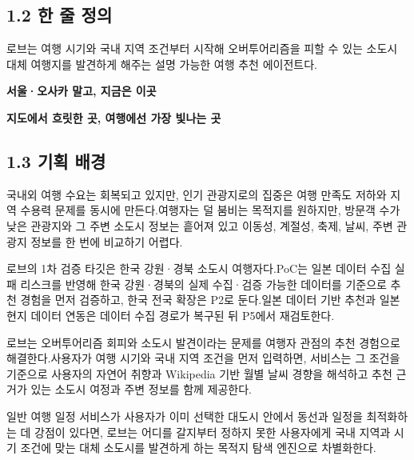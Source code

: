 \documentclass[12pt,a4paper]{article}
\newcommand{\DocNeedspace}[1]{\par\ifdim\dimexpr\pagegoal-\pagetotal\relax<#1\newpage\fi}
\begin{document}
\DocNeedspace{24\baselineskip}
\subsection*{1.2 한 줄 정의}


\DocNeedspace{3\baselineskip}
로브는 여행 시기와 국내 지역 조건부터 시작해 오버투어리즘을 피할 수 있는 소도시 대체 여행지를 발견하게 해주는 설명 가능한 여행 추천 에이전트다.


\DocNeedspace{3\baselineskip}
\textbf{서울·오사카 말고, 지금은 이곳}


\DocNeedspace{3\baselineskip}
\textbf{지도에서 흐릿한 곳, 여행에선 가장 빛나는 곳}


\DocNeedspace{24\baselineskip}
\subsection*{1.3 기획 배경}


\DocNeedspace{3\baselineskip}
국내외 여행 수요는 회복되고 있지만, 인기 관광지로의 집중은 여행 만족도 저하와 지역 수용력 문제를 동시에 만든다.\newline 여행자는 덜 붐비는 목적지를 원하지만, 방문객 수가 낮은 관광지와 그 주변 소도시 정보는 흩어져 있고 이동성, 계절성, 축제, 날씨, 주변 관광지 정보를 한 번에 비교하기 어렵다.


\DocNeedspace{3\baselineskip}
로브의 1차 검증 타깃은 한국 강원·경북 소도시 여행자다.\newline PoC는 일본 데이터 수집 실패 리스크를 반영해 한국 강원·경북의 실제 수집·검증 가능한 데이터를 기준으로 추천 경험을 먼저 검증하고, 한국 전국 확장은 P2로 둔다.\newline 일본 데이터 기반 추천과 일본 현지 데이터 연동은 데이터 수집 경로가 복구된 뒤 P5에서 재검토한다.


\DocNeedspace{3\baselineskip}
로브는 오버투어리즘 회피와 소도시 발견이라는 문제를 여행자 관점의 추천 경험으로 해결한다.\newline 사용자가 여행 시기와 국내 지역 조건을 먼저 입력하면, 서비스는 그 조건을 기준으로 사용자의 자연어 취향과 Wikipedia 기반 월별 날씨 경향을 해석하고 추천 근거가 있는 소도시 여정과 주변 정보를 함께 제공한다.


\DocNeedspace{3\baselineskip}
일반 여행 일정 서비스가 사용자가 이미 선택한 대도시 안에서 동선과 일정을 최적화하는 데 강점이 있다면, 로브는 어디를 갈지부터 정하지 못한 사용자에게 국내 지역과 시기 조건에 맞는 대체 소도시를 발견하게 하는 목적지 탐색 엔진으로 차별화한다.
\end{document}

